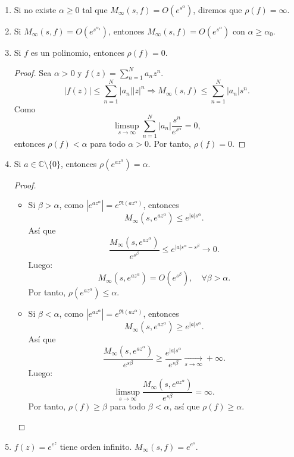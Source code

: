 \begin{remark}
    \hfill
    \begin{enumerate}
        \item Si no existe $\alpha \geq 0$ tal que $M_\infty(s, f) = O(e^{s^\alpha})$, diremos que $\rho(f) = \infty$.

        \item Si $M_\infty(s, f) = O(e^{s^{\alpha_0}})$, entonces $M_\infty(s, f) = O(e^{s^\alpha})$ con $\alpha \geq \alpha_0$.

        \item Si $f$ es un polinomio, entonces $\rho(f) = 0$.
              \begin{proof}
                  Sea $\alpha > 0$ y $f(z) = \sum_{n=1}^N a_nz^n$.
                  $$|f(z)| \leq \sum_{n=1}^N |a_n||z|^n \Rightarrow M_\infty(s, f) \leq \sum_{n=1}^N |a_n|s^n.$$
                  Como
                  $$\limsup_{s \to \infty} \sum_{n=1}^N |a_n|\frac{s^n}{e^{s^\alpha}} = 0,$$
                  entonces $\rho(f) < \alpha$ para todo $\alpha > 0$.
                  Por tanto, $\rho(f) = 0$.
              \end{proof}

        \item Si $a \in \mathbb{C} \setminus \{0\}$, entonces $\rho(e^{az^\alpha}) = \alpha$.
              \begin{proof}
                  \hfill
                  \begin{itemize}
                      \item Si $\beta > \alpha$, como $|e^{az^\alpha}| = e^{\Re(az^\alpha)}$, entonces
                            $$M_\infty(s, e^{az^\alpha}) \leq e^{|a|s^\alpha}.$$
                            Así que
                            $$\frac{M_\infty(s, e^{az^\alpha})}{e^{s^\beta}} \leq e^{|a|s^\alpha - s^\beta} \to 0.$$
                            Luego:
                            $$M_\infty(s, e^{az^\alpha}) = O(e^{s^\beta}), \quad \forall \beta > \alpha.$$
                            Por tanto, $\rho(e^{az^\alpha}) \leq \alpha$.

                      \item Si $\beta < \alpha$, como $|e^{az^\alpha}| = e^{\Re(az^\alpha)}$, entonces
                            $$M_\infty(s, e^{az^\alpha}) \geq e^{|a|s^\alpha}.$$
                            Así que
                            $$\frac{M_\infty(s, e^{az^\alpha})}{e^{s\beta}} \geq \frac{e^{|a|s^\alpha}}{e^{s\beta}} \xrightarrow[s \to \infty]{} +\infty.$$
                            Luego:
                            $$\limsup_{s \to \infty} \frac{M_\infty(s, e^{az^\alpha})}{e^{s\beta}} = \infty.$$
                            Por tanto, $\rho(f) \geq \beta$ para todo $\beta < \alpha$, así que $\rho(f) \geq \alpha$.
                  \end{itemize}
              \end{proof}

        \item $f(z) = e^{e^z}$ tiene orden infinito.
              $M_\infty(s, f) = e^{e^s}$.
    \end{enumerate}
\end{remark}

